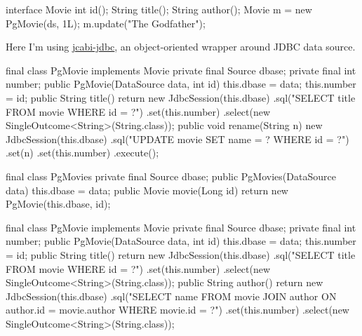 \documentclass{article}
\begin{document}
\begin{pptWide}{2}
{\small\begin{ffcode}
interface Movie {
  int id();
  String title();
  String author();
}
Movie m = new PgMovie(ds, 1L);
m.update("The Godfather");
\end{ffcode}
}
\par
Here I'm using \href{https://github.com/jcabi/jcabi-jdbc}{jcabi-jdbc},
an object-oriented wrapper around JDBC data source.
\par\columnbreak\par
{\scriptsize\begin{ffcode}
final class PgMovie implements Movie
  private final Source dbase;
  private final int number;
  public PgMovie(DataSource data, int id)
    this.dbase = data;
    this.number = id;
  public String title()
    return new JdbcSession(this.dbase)
      .sql("SELECT title FROM movie WHERE id = ?")
      .set(this.number)
      .select(new SingleOutcome<String>(String.class));
  public void rename(String n)
    new JdbcSession(this.dbase)
      .sql("UPDATE movie SET name = ? WHERE id = ?")
      .set(n)
      .set(this.number)
      .execute();
\end{ffcode}
}
\end{pptWide}
\par
\plush{}

\begin{pptWide}{2}
{\small\begin{ffcode}
final class PgMovies
  private final Source dbase;
  public PgMovies(DataSource data)
    this.dbase = data;
  public Movie movie(Long id)
    return new PgMovie(this.dbase, id);
\end{ffcode}
}
\par\columnbreak\par
{\scriptsize\begin{ffcode}
final class PgMovie implements Movie
  private final Source dbase;
  private final int number;
  public PgMovie(DataSource data, int id)
    this.dbase = data;
    this.number = id;
  public String title()
    return new JdbcSession(this.dbase)
      .sql("SELECT title FROM movie WHERE id = ?")
      .set(this.number)
      .select(new SingleOutcome<String>(String.class));
  public String author()
    return new JdbcSession(this.dbase)
      .sql("SELECT name FROM movie JOIN author ON author.id = movie.author WHERE movie.id = ?")
      .set(this.number)
      .select(new SingleOutcome<String>(String.class));
\end{ffcode}
}
\end{pptWide}
\par
\plush{}

\end{document}
